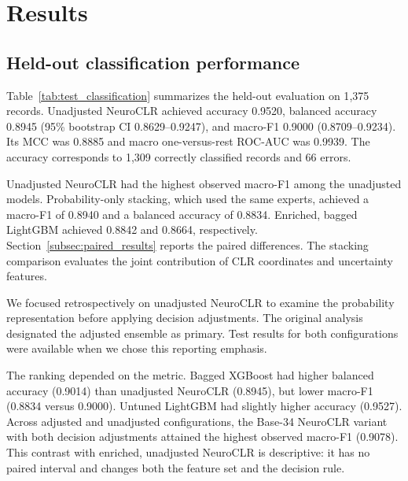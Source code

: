 \section{Results}
\label{sec:results}

\subsection{Held-out classification performance}

Table~\ref{tab:test_classification} summarizes the held-out evaluation on 1{,}375 records. Unadjusted NeuroCLR achieved accuracy 0.9520, balanced accuracy 0.8945 (95\% bootstrap CI 0.8629--0.9247), and macro-F1 0.9000 (0.8709--0.9234). Its MCC was 0.8885 and macro one-versus-rest ROC-AUC was 0.9939. The accuracy corresponds to 1{,}309 correctly classified records and 66 errors.

Unadjusted NeuroCLR had the highest observed macro-F1 among the unadjusted models. Probability-only stacking, which used the same experts, achieved a macro-F1 of 0.8940 and a balanced accuracy of 0.8834. Enriched, bagged LightGBM achieved 0.8842 and 0.8664, respectively. Section~\ref{subsec:paired_results} reports the paired differences. The stacking comparison evaluates the joint contribution of CLR coordinates and uncertainty features.

We focused retrospectively on unadjusted NeuroCLR to examine the probability representation before applying decision adjustments. The original analysis designated the adjusted ensemble as primary. Test results for both configurations were available when we chose this reporting emphasis.

The ranking depended on the metric. Bagged XGBoost had higher balanced accuracy (0.9014) than unadjusted NeuroCLR (0.8945), but lower macro-F1 (0.8834 versus 0.9000). Untuned LightGBM had slightly higher accuracy (0.9527). Across adjusted and unadjusted configurations, the Base-34 NeuroCLR variant with both decision adjustments attained the highest observed macro-F1 (0.9078). This contrast with enriched, unadjusted NeuroCLR is descriptive: it has no paired interval and changes both the feature set and the decision rule.

